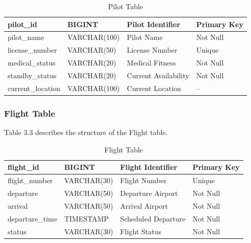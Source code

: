 \documentclass[12pt,a4paper]{report}
\begin{document}
\begin{table}[H]

\centering

\caption{Pilot Table}

\begin{tabular}{|p{3.5cm}|p{2.5cm}|p{5cm}|p{2.5cm}|}

\hline

pilot\_id & BIGINT & Pilot Identifier & Primary Key\\
\hline

pilot\_name & VARCHAR(100) & Pilot Name & Not Null\\
\hline

license\_number & VARCHAR(50) & License Number & Unique\\
\hline

medical\_status & VARCHAR(20) & Medical Fitness & Not Null\\
\hline

standby\_status & VARCHAR(20) & Current Availability & Not Null\\
\hline

current\_location & VARCHAR(100) & Current Location & --\\
\hline

\end{tabular}

\end{table}

\subsubsection{Flight Table}

Table 3.3 describes the structure of the Flight table.

\begin{table}[H]

\centering

\caption{Flight Table}

\begin{tabular}{|p{3.5cm}|p{2.5cm}|p{5cm}|p{2.5cm}|}

\hline

flight\_id & BIGINT & Flight Identifier & Primary Key\\
\hline

flight\_number & VARCHAR(30) & Flight Number & Unique\\
\hline

departure & VARCHAR(50) & Departure Airport & Not Null\\
\hline

arrival & VARCHAR(50) & Arrival Airport & Not Null\\
\hline

departure\_time & TIMESTAMP & Scheduled Departure & Not Null\\
\hline

status & VARCHAR(30) & Flight Status & Not Null\\
\hline

\end{tabular}

\end{table}
\end{document}
